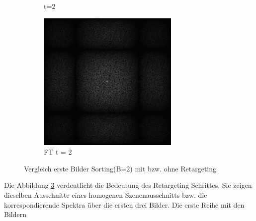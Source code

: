 \begin{figure}[H]
\begin{tcolorbox}[boxrule=4pt,sharp corners=downhill,title=Bedeutung des Retargeting]
\begin{subfigure}[b]{0.2\linewidth}
         \caption{t=2}
         \label{pic:retarget_screen_t2}
    \end{subfigure}
    \begin{subfigure}[b]{0.2\linewidth}
        \includegraphics[width=\linewidth]{content/TemporalerAlg/Bilder/Retargeting/Bedeutung Retargeting/Sorting_Small_Block_WithRetargeting/Spektrum/Ausschnitt3.png}
         \caption{FT t = 2}
         \label{pic:retarget_t2}
    \end{subfigure}
    \end{tcolorbox}
    \caption{Vergleich erste Bilder Sorting(B=2) mit bzw. ohne Retargeting}
    \label{fig:VergleichRetargetSorting}
\end{figure}

Die Abbildung \ref{fig:VergleichRetargetSorting} verdeutlicht die Bedeutung des Retargeting 
Schrittes. Sie zeigen dieselben Ausschnitte eines homogenen Szenenausschnitts bzw. die korrespondierende 
Spektra über die ersten drei Bilder. Die erste Reihe mit den Bildern

